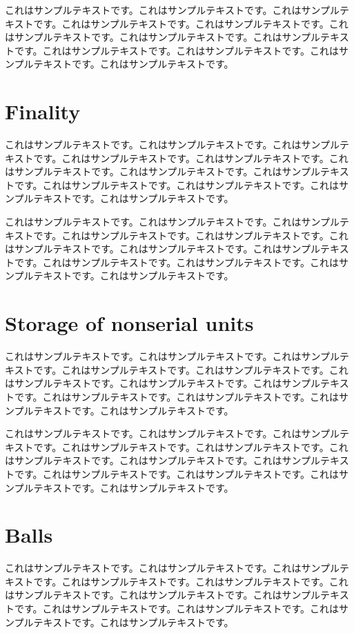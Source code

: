 \documentclass[a4paper, dvipdfmx]{jsarticle}
\begin{document}
これはサンプルテキストです。これはサンプルテキストです。これはサンプルテキストです。これはサンプルテキストです。これはサンプルテキストです。これはサンプルテキストです。これはサンプルテキストです。これはサンプルテキストです。これはサンプルテキストです。これはサンプルテキストです。これはサンプルテキストです。これはサンプルテキストです。

\section{Finality}
これはサンプルテキストです。これはサンプルテキストです。これはサンプルテキストです。これはサンプルテキストです。これはサンプルテキストです。これはサンプルテキストです。これはサンプルテキストです。これはサンプルテキストです。これはサンプルテキストです。これはサンプルテキストです。これはサンプルテキストです。これはサンプルテキストです。

これはサンプルテキストです。これはサンプルテキストです。これはサンプルテキストです。これはサンプルテキストです。これはサンプルテキストです。これはサンプルテキストです。これはサンプルテキストです。これはサンプルテキストです。これはサンプルテキストです。これはサンプルテキストです。これはサンプルテキストです。これはサンプルテキストです。

\section{Storage of nonserial units}
これはサンプルテキストです。これはサンプルテキストです。これはサンプルテキストです。これはサンプルテキストです。これはサンプルテキストです。これはサンプルテキストです。これはサンプルテキストです。これはサンプルテキストです。これはサンプルテキストです。これはサンプルテキストです。これはサンプルテキストです。これはサンプルテキストです。

これはサンプルテキストです。これはサンプルテキストです。これはサンプルテキストです。これはサンプルテキストです。これはサンプルテキストです。これはサンプルテキストです。これはサンプルテキストです。これはサンプルテキストです。これはサンプルテキストです。これはサンプルテキストです。これはサンプルテキストです。これはサンプルテキストです。

\section{Balls}
これはサンプルテキストです。これはサンプルテキストです。これはサンプルテキストです。これはサンプルテキストです。これはサンプルテキストです。これはサンプルテキストです。これはサンプルテキストです。これはサンプルテキストです。これはサンプルテキストです。これはサンプルテキストです。これはサンプルテキストです。これはサンプルテキストです。
\end{document}
